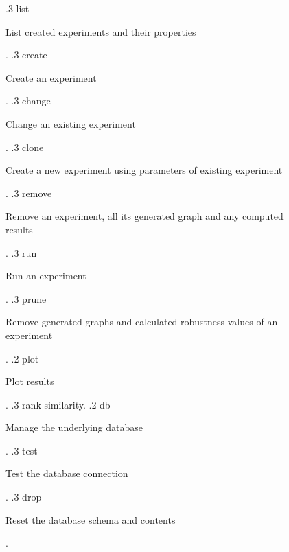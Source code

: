 \begin{figure}
\begin{flushleft}
{.3 list \scriptsize \dotfill\ \begin{minipage}[t]{10.6cm}List created experiments and their properties\end{minipage}.
.3 create \scriptsize \dotfill\ \begin{minipage}[t]{10.6cm}Create an experiment\end{minipage}.
.3 change \scriptsize \dotfill\ \begin{minipage}[t]{10.6cm}Change an existing experiment\end{minipage}.
.3 clone \scriptsize \dotfill\ \begin{minipage}[t]{10.6cm}Create a new experiment using parameters of existing experiment\end{minipage}.
.3 remove \scriptsize \dotfill\ \begin{minipage}[t]{10.6cm}Remove an experiment, all its generated graph and any computed results\end{minipage}.
.3 run \scriptsize \dotfill\ \begin{minipage}[t]{10.6cm}Run an experiment\end{minipage}.
.3 prune \scriptsize \dotfill\ \begin{minipage}[t]{10.6cm}Remove generated graphs and calculated robustness values of an experiment\end{minipage}.
.2 plot \scriptsize \dotfill\ \begin{minipage}[t]{10.6cm}Plot results\end{minipage}.
.3 rank-similarity.
.2 db \scriptsize \dotfill\ \begin{minipage}[t]{10.6cm}Manage the underlying database\end{minipage}.
.3 test \scriptsize \dotfill\ \begin{minipage}[t]{10.6cm}Test the database connection\end{minipage}.
.3 drop \scriptsize \dotfill\ \begin{minipage}[t]{10.6cm}Reset the database schema and contents\end{minipage}.
}
\end{flushleft}
\end{figure}
